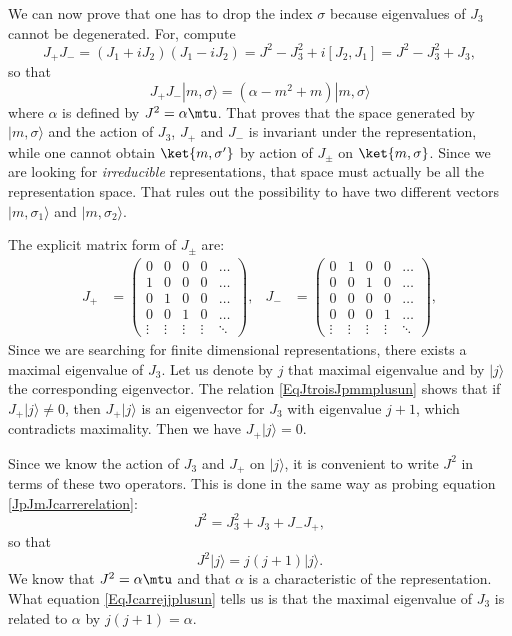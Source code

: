 We can now prove that one has to drop the index $\sigma$ because eigenvalues of $J_3$ cannot be degenerated. For, compute
\begin{equation}        \label{JpJmJcarrerelation}
    J_+J_-=(J_1+iJ_2)(J_1-iJ_2)=J^2-J_3^2+i[J_2,J_1]=J^2-J_3^2+J_3,
\end{equation}
so that
\[ 
    J_+J_-| m,\sigma \rangle =(\alpha-m^2+m)| m,\sigma \rangle 
\]
where $\alpha$ is defined by $J^2=\alpha\mtu$. That proves that the space generated by $| m,\sigma \rangle $ and the action of $J_3$, $J_+$ and $J_-$ is invariant under the representation, while one cannot obtain $\ket{m,\sigma'}$ by action of $J_{\pm}$ on $\ket{m,\sigma}$. Since we are looking for \emph{irreducible} representations, that space must actually be all the representation space. That rules out the possibility to have two different vectors $| m,\sigma_1 \rangle $ and $| m,\sigma_2 \rangle $.

The explicit matrix form of $J_{\pm}$ are:
\begin{align}
J_{+}&=
\begin{pmatrix}
0   &   0   &   0   &0  &\hdots\\
1   &   0   &   0   &0  &\hdots\\
0   &   1   &   0   &0  &\hdots\\
0   &   0   &   1   &0  &\hdots\\
\vdots  &   \vdots  &   \vdots  &\vdots &\ddots
\end{pmatrix},
&J_{-}&=
\begin{pmatrix}
0   &   1   &   0   &0  &\hdots\\
0   &   0   &   1   &0  &\hdots\\
0   &   0   &   0   &0  &\hdots\\
0   &   0   &   0   &1  &\hdots\\
\vdots  &   \vdots  &   \vdots  &\vdots &\ddots
\end{pmatrix},
\end{align}
Since we are searching for finite dimensional representations, there exists a maximal eigenvalue of $J_3$. Let us denote by $j$ that maximal eigenvalue and by $| j \rangle$ the corresponding eigenvector. The relation \eqref{EqJtroisJpmmplusun} shows that if $J_+| j \rangle\neq 0$, then $J_+| j \rangle$ is an eigenvector for $J_3$ with eigenvalue $j+1$, which contradicts maximality. Then we have $J_+| j \rangle=0$.

Since we know the action of $J_3$ and $J_+$ on $| j \rangle$, it is convenient to write $J^2$ in terms of these two operators. This is done in the same way as probing equation \eqref{JpJmJcarrerelation}:
\begin{equation}
    J^2=J_3^2+J_3+J_-J_+,
\end{equation}
so that
\begin{equation}        \label{EqJcarrejjplusun}
    J^2| j \rangle=j(j+1)| j \rangle.
\end{equation}
We know that $J^2=\alpha\mtu$ and that $\alpha$ is a characteristic of the representation. What equation \eqref{EqJcarrejjplusun} tells us is that the maximal eigenvalue of $J_3$ is related to $\alpha$ by $j(j+1)=\alpha$.

